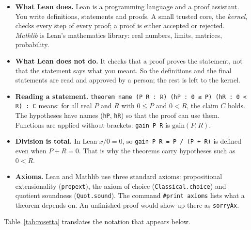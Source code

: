 \documentclass[11pt]{article}
\newcommand{\leanus}{\textunderscore\allowbreak}%
\newcommand{\lean}[1]{\begingroup\let\_\leanus\texttt{#1}\endgroup}
\begin{document}
\begin{itemize}
  \item \textbf{What Lean does.} Lean is a programming language and a proof assistant. You
    write definitions, statements and proofs. A small trusted core, the \emph{kernel}, checks
    every step of every proof; a proof is either accepted or rejected. \emph{Mathlib} is
    Lean's mathematics library: real numbers, limits, matrices, probability.
  \item \textbf{What Lean does not do.} It checks that a proof proves the statement, not that
    the statement says what you meant. So the definitions and the final statements are read
    and approved by a person; the rest is left to the kernel.
  \item \textbf{Reading a statement.} \lean{theorem name (P R : ℝ) (hP : 0 ≤ P) (hR : 0 < R) :
    C} means: for all real $P$ and $R$ with $0 \le P$ and $0 < R$, the claim $C$ holds. The
    hypotheses have names (\lean{hP}, \lean{hR}) so that the proof can use them. Functions are
    applied without brackets: \lean{gain P R} is $\mathrm{gain}(P, R)$.
  \item \textbf{Division is total.} In Lean $x / 0 = 0$, so \lean{gain P R = P / (P + R)} is
    defined even when $P + R = 0$. That is why the theorems carry hypotheses such as $0 < R$.
  \item \textbf{Axioms.} Lean and Mathlib use three standard axioms: propositional
    extensionality (\lean{propext}), the axiom of choice (\lean{Classical.choice}) and
    quotient soundness (\lean{Quot.sound}). The command \lean{\#print axioms} lists what a
    theorem depends on. An unfinished proof would show up there as \lean{sorryAx}.
\end{itemize}

Table~\ref{tab:rosetta} translates the notation that appears below.
\end{document}
